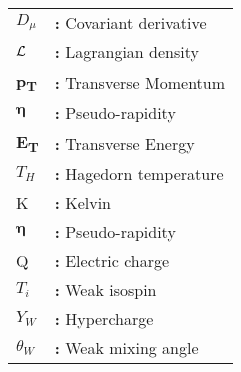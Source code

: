 \begin{tabular}{@{}p{2cm}l}
{$D_\mu$} & {\bf:} Covariant derivative\\
{$\mathcal{L}$} & {\bf:} Lagrangian density\\
{\bf p\textsubscript{T}} & {\bf:} Transverse Momentum\\
{$\boldsymbol\eta$} & {\bf:} Pseudo-rapidity\\
{\bf E\textsubscript{T}} & {\bf:} Transverse Energy\\
{$T_H$} & {\bf:} Hagedorn temperature\\
{K} & {\bf:} Kelvin\\
{$\boldsymbol\eta$} & {\bf:} Pseudo-rapidity\\
{Q} & {\bf:} Electric charge\\
{$T_i$} & {\bf:} Weak isospin\\
{$Y_W$} & {\bf:} Hypercharge\\
{$\theta_W$} & {\bf:} Weak mixing angle\\
\end{tabular}

